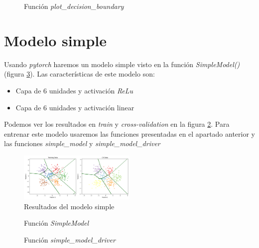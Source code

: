 \documentclass[6pt]{../../shared/AiTex}
\begin{document}
\begin{figure}[H]
    \centering
    
    \caption{Función \textit{plot\_decision\_boundary}}
    \label{fig:plot_decision_boundary}
\end{figure}
\section{Modelo simple}

Usando \textit{pytorch} haremos un modelo simple visto en la función \textit{SimpleModel()} (figura \ref{fig:SimpleModel}). Las características de este modelo son:
\begin{itemize}
    \item Capa de 6 unidades y activación \textit{ReLu}
    \item Capa de 6 unidades y activación linear
\end{itemize}

Podemos ver los resultados en \textit{train} y \textit{cross-validation} en la figura \ref{fig:simple_results}. Para entrenar este modelo usaremos las funciones presentadas en el apartado anterior y las funciones \textit{simple\_model} y \textit{simple\_model\_driver}

\begin{figure}[H]
    \centering
    \includegraphics[width=0.5\textwidth]{./images/decision_boundary_simple.png}
    \caption{Resultados del modelo simple}
    \label{fig:simple_results}
\end{figure}

\begin{figure}[H]
    \centering
    
    \caption{Función \textit{SimpleModel}}
    \label{fig:SimpleModel}
\end{figure}

\begin{figure}[H]
    \centering
    
    \caption{Función \textit{simple\_model\_driver}}
    \label{fig:simple_model_driver}
\end{figure}
\end{document}
